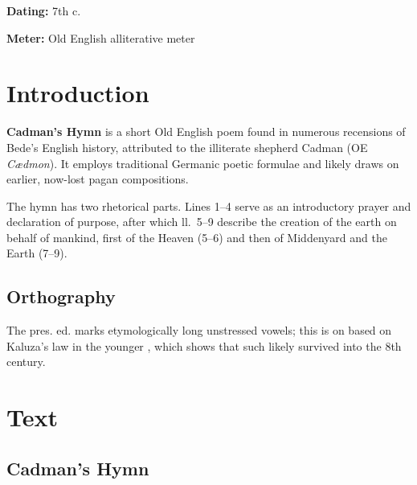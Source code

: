 
\begin{flushright}%
\textbf{Dating:} 7th c.

\textbf{Meter:} Old English alliterative meter
\end{flushright}%

\section{Introduction}

\textbf{Cadman’s Hymn} is a short Old English poem found in numerous recensions of Bede’s English history, attributed to the illiterate shepherd Cadman (OE \emph{Cædmon}).  It employs traditional Germanic poetic formulae and likely draws on earlier, now-lost pagan compositions.

The hymn has two rhetorical parts.  Lines 1--4 serve as an introductory prayer and declaration of purpose, after which ll.~5--9 describe the creation of the earth on behalf of mankind, first of the Heaven (5--6) and then of Middenyard and the Earth (7--9).

\subsection{Orthography}

The pres. ed. marks etymologically long unstressed vowels; this is on based on Kaluza’s law in the younger \Beowulf, which shows that such likely survived into the 8th century.

\newpage

\section{Text}

\subsection{Cadman’s Hymn}

